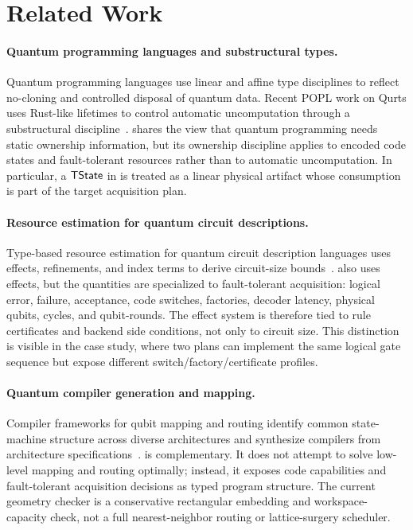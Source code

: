 \section{Related Work}

\paragraph{Quantum programming languages and substructural types.}
Quantum programming languages use linear and affine type disciplines to reflect no-cloning and controlled disposal of quantum data.
Recent POPL work on Qurts uses Rust-like lifetimes to control automatic uncomputation through a substructural discipline~\cite{hirata2025qurts}.
\system shares the view that quantum programming needs static ownership information, but its ownership discipline applies to encoded code states and fault-tolerant resources rather than to automatic uncomputation.
In particular, a $\mathsf{TState}$ in \system is treated as a linear physical artifact whose consumption is part of the target acquisition plan.

\paragraph{Resource estimation for quantum circuit descriptions.}
Type-based resource estimation for quantum circuit description languages uses effects, refinements, and index terms to derive circuit-size bounds~\cite{colledan2025resource}.
\system also uses effects, but the quantities are specialized to fault-tolerant acquisition: logical error, failure, acceptance, code switches, factories, decoder latency, physical qubits, cycles, and qubit-rounds.
The effect system is therefore tied to rule certificates and backend side conditions, not only to circuit size.
This distinction is visible in the case study, where two plans can implement the same logical gate sequence but expose different switch/factory/certificate profiles.

\paragraph{Quantum compiler generation and mapping.}
Compiler frameworks for qubit mapping and routing identify common state-machine structure across diverse architectures and synthesize compilers from architecture specifications~\cite{molavi2026qmr}.
\system is complementary.
It does not attempt to solve low-level mapping and routing optimally; instead, it exposes code capabilities and fault-tolerant acquisition decisions as typed program structure.
The current geometry checker is a conservative rectangular embedding and workspace-capacity check, not a full nearest-neighbor routing or lattice-surgery scheduler.

